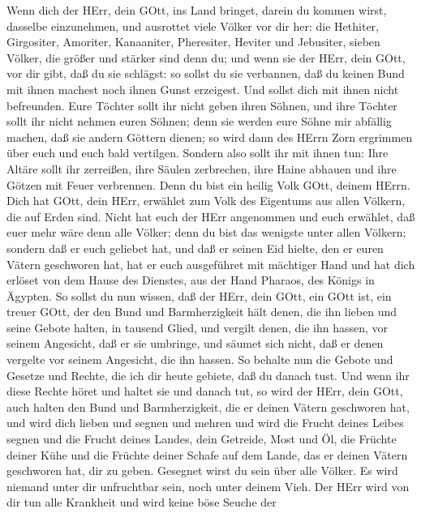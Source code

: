  Wenn dich der HErr, dein GOtt, ins Land bringet, darein du
kommen wirst, dasselbe einzunehmen, und ausrottet viele Völker vor dir
her: die Hethiter, Girgositer, Amoriter, Kanaaniter, Pheresiter, Heviter
und Jebusiter, sieben Völker, die größer und stärker sind denn du;
 und wenn sie der HErr, dein GOtt, vor dir gibt, daß du sie
schlägst: so sollst du sie verbannen, daß du keinen Bund mit ihnen
machest noch ihnen Gunst erzeigest.  Und sollst dich mit
ihnen nicht befreunden. Eure Töchter sollt ihr nicht geben ihren Söhnen,
und ihre Töchter sollt ihr nicht nehmen euren Söhnen;  denn
sie werden eure Söhne mir abfällig machen, daß sie andern Göttern
dienen; so wird dann des HErrn Zorn ergrimmen über euch und euch bald
vertilgen.  Sondern also sollt ihr mit ihnen tun: Ihre
Altäre sollt ihr zerreißen, ihre Säulen zerbrechen, ihre Haine abhauen
und ihre Götzen mit Feuer verbrennen.  Denn du bist ein
heilig Volk GOtt, deinem HErrn. Dich hat GOtt, dein HErr, erwählet zum
Volk des Eigentums aus allen Völkern, die auf Erden sind. 
Nicht hat euch der HErr angenommen und euch erwählet, daß euer mehr wäre
denn alle Völker; denn du bist das wenigste unter allen Völkern;
 sondern daß er euch geliebet hat, und daß er seinen Eid
hielte, den er euren Vätern geschworen hat, hat er euch ausgeführet mit
mächtiger Hand und hat dich erlöset von dem Hause des Dienstes, aus der
Hand Pharaos, des Königs in Ägypten.  So sollst du nun
wissen, daß der HErr, dein GOtt, ein GOtt ist, ein treuer GOtt, der den
Bund und Barmherzigkeit hält denen, die ihn lieben und seine Gebote
halten, in tausend Glied,  und vergilt denen, die ihn
hassen, vor seinem Angesicht, daß er sie umbringe, und säumet sich
nicht, daß er denen vergelte vor seinem Angesicht, die ihn hassen.
 So behalte nun die Gebote und Gesetze und Rechte, die ich
dir heute gebiete, daß du danach tust.  Und wenn ihr diese
Rechte höret und haltet sie und danach tut, so wird der HErr, dein GOtt,
auch halten den Bund und Barmherzigkeit, die er deinen Vätern geschworen
hat,  und wird dich lieben und segnen und mehren und wird
die Frucht deines Leibes segnen und die Frucht deines Landes, dein
Getreide, Most und Öl, die Früchte deiner Kühe und die Früchte deiner
Schafe auf dem Lande, das er deinen Vätern geschworen hat, dir zu geben.
 Gesegnet wirst du sein über alle Völker. Es wird niemand
unter dir unfruchtbar sein, noch unter deinem Vieh.  Der
HErr wird von dir tun alle Krankheit und wird keine böse Seuche der
